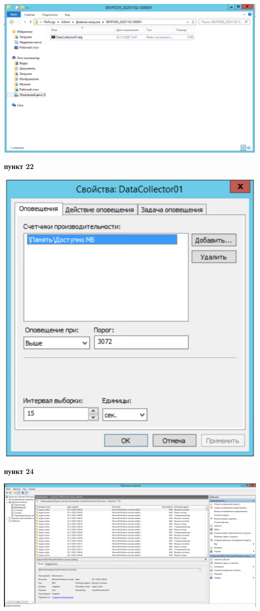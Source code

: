 \documentclass[a4paper,14pt]{extarticle}
\begin{document}
    \begin{center}
        \includegraphics[scale=0.6]{21.2.png}
    \end{center}

    \textbf{пункт 22}
    \begin{center}
        \includegraphics[scale=0.7]{22.png}
    \end{center}

    \newpage
    \textbf{пункт 24}
    \begin{center}
        \includegraphics[scale=0.4]{24.b.png}
    \end{center}
\end{document}
